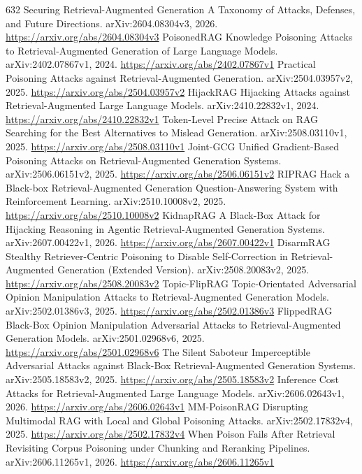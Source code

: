 \documentclass[11pt]{article}
\begin{document}
\begin{thebibliography}{632}
 Securing Retrieval-Augmented Generation A Taxonomy of Attacks, Defenses, and Future Directions. arXiv:2604.08304v3, 2026. \url{https://arxiv.org/abs/2604.08304v3}
 PoisonedRAG Knowledge Poisoning Attacks to Retrieval-Augmented Generation of Large Language Models. arXiv:2402.07867v1, 2024. \url{https://arxiv.org/abs/2402.07867v1}
 Practical Poisoning Attacks against Retrieval-Augmented Generation. arXiv:2504.03957v2, 2025. \url{https://arxiv.org/abs/2504.03957v2}
 HijackRAG Hijacking Attacks against Retrieval-Augmented Large Language Models. arXiv:2410.22832v1, 2024. \url{https://arxiv.org/abs/2410.22832v1}
 Token-Level Precise Attack on RAG Searching for the Best Alternatives to Mislead Generation. arXiv:2508.03110v1, 2025. \url{https://arxiv.org/abs/2508.03110v1}
 Joint-GCG Unified Gradient-Based Poisoning Attacks on Retrieval-Augmented Generation Systems. arXiv:2506.06151v2, 2025. \url{https://arxiv.org/abs/2506.06151v2}
 RIPRAG Hack a Black-box Retrieval-Augmented Generation Question-Answering System with Reinforcement Learning. arXiv:2510.10008v2, 2025. \url{https://arxiv.org/abs/2510.10008v2}
 KidnapRAG A Black-Box Attack for Hijacking Reasoning in Agentic Retrieval-Augmented Generation Systems. arXiv:2607.00422v1, 2026. \url{https://arxiv.org/abs/2607.00422v1}
 DisarmRAG Stealthy Retriever-Centric Poisoning to Disable Self-Correction in Retrieval-Augmented Generation (Extended Version). arXiv:2508.20083v2, 2025. \url{https://arxiv.org/abs/2508.20083v2}
 Topic-FlipRAG Topic-Orientated Adversarial Opinion Manipulation Attacks to Retrieval-Augmented Generation Models. arXiv:2502.01386v3, 2025. \url{https://arxiv.org/abs/2502.01386v3}
 FlippedRAG Black-Box Opinion Manipulation Adversarial Attacks to Retrieval-Augmented Generation Models. arXiv:2501.02968v6, 2025. \url{https://arxiv.org/abs/2501.02968v6}
 The Silent Saboteur Imperceptible Adversarial Attacks against Black-Box Retrieval-Augmented Generation Systems. arXiv:2505.18583v2, 2025. \url{https://arxiv.org/abs/2505.18583v2}
 Inference Cost Attacks for Retrieval-Augmented Large Language Models. arXiv:2606.02643v1, 2026. \url{https://arxiv.org/abs/2606.02643v1}
 MM-PoisonRAG Disrupting Multimodal RAG with Local and Global Poisoning Attacks. arXiv:2502.17832v4, 2025. \url{https://arxiv.org/abs/2502.17832v4}
 When Poison Fails After Retrieval Revisiting Corpus Poisoning under Chunking and Reranking Pipelines. arXiv:2606.11265v1, 2026. \url{https://arxiv.org/abs/2606.11265v1}

\end{thebibliography}
\end{document}
